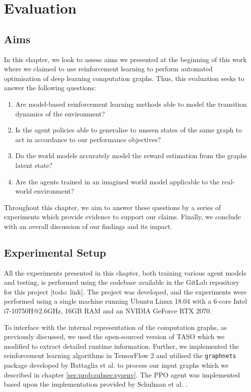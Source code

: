 \chapter{Evaluation}

\section{Aims}

In this chapter, we look to assess aims we presented at the beginning of this work where we claimed to use reinforcement learning to perform automated optimisation of deep learning computation graphs. Thus, this evaluation seeks to answer the following questions:

\begin{enumerate}
  \item Are model-based reinforcement learning methods able to model the transition dynamics of the environment?
  \item Is the agent policies able to generalise to unseen states of the same graph to act in accordance to our performance objectives?
  \item Do the world models accurately model the reward estimation from the graphs latent state?
  \item Are the agents trained in an imagined world model applicable to the real-world environment?
\end{enumerate}

Throughout this chapter, we aim to answer these questions by a series of experiments which provide evidence to support our claims. Finally, we conclude with an overall discussion of our findings and its impact.

\section{Experimental Setup}

All the experiments presented in this chapter, both training various agent models and testing, is performed using the codebase available in the GitLab repository for this project [todo: link]. The project was developed, and the experiments were performed using a single machine running Ubuntu Linux 18.04 with a 6-core Intel i7-10750H@2.6GHz, 16GB RAM and an NVIDIA GeForce RTX 2070.

To interface with the internal representation of the computation graphs, as previously discussed, we used the open-sourced version of TASO \cite{jia2019taso} which we modified to extract detailed runtime information. Further, we implemented the reinforcement learning algorithms in TensorFlow 2 \cite{tensorflow2015-whitepaper} and utilised the \texttt{graph\textunderscore nets} package developed by Battaglia et al. \cite{battaglia2018relational} to process our input graphs which we described in chapter \ref{sec:prob:subsec:sysenv}. The PPO agent was implemented based upon the implementation provided by Schulman et al. \cite{schulman2017proximal}.


